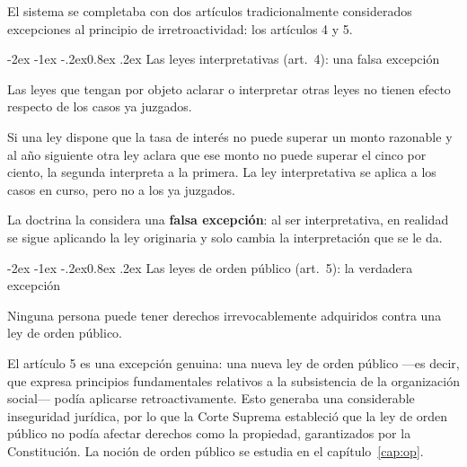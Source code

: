 \documentclass[12pt,oneside]{book}
\makeatletter
\renewcommand\subsubsection{\@startsection{subsubsection}{3}{\z@}%
  {-2ex \@plus -1ex \@minus -.2ex}{0.8ex \@plus .2ex}%
  {\normalfont\normalsize\bfseries\itshape}}
\makeatother
\begin{document}
El sistema se completaba con dos artículos tradicionalmente considerados excepciones al principio de irretroactividad: los artículos 4 y 5.

\subsubsection{Las leyes interpretativas (art.~4): una falsa excepción}

\begin{regla}
Las leyes que tengan por objeto aclarar o interpretar otras leyes no tienen efecto respecto de los casos ya juzgados.
\end{regla}

\begin{ejemplo}
Si una ley dispone que la tasa de interés no puede superar un monto razonable y al año siguiente otra ley aclara que ese monto no puede superar el cinco por ciento, la segunda interpreta a la primera. La ley interpretativa se aplica a los casos en curso, pero no a los ya juzgados.
\end{ejemplo}

La doctrina la considera una \textbf{falsa excepción}: al ser interpretativa, en realidad se sigue aplicando la ley originaria y solo cambia la interpretación que se le da.

\subsubsection{Las leyes de orden público (art.~5): la verdadera excepción}

\begin{regla}
Ninguna persona puede tener derechos irrevocablemente adquiridos contra una ley de orden público.
\end{regla}

\begin{importante}
El artículo 5 es una excepción genuina: una nueva ley de orden público ---es decir, que expresa principios fundamentales relativos a la subsistencia de la organización social--- podía aplicarse retroactivamente. Esto generaba una considerable inseguridad jurídica, por lo que la Corte Suprema estableció que la ley de orden público no podía afectar derechos como la propiedad, garantizados por la Constitución. La noción de orden público se estudia en el capítulo~\ref{cap:op}.
\end{importante}
\end{document}
